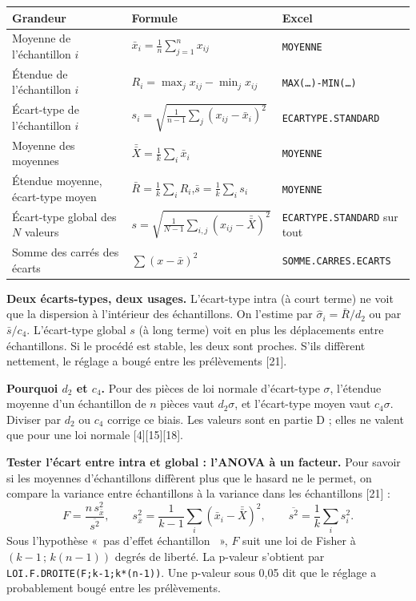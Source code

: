 \documentclass[11pt,a4paper]{article}
\providecommand{\og}{«~}\providecommand{\fg}{~»}
\newcommand{\xbb}{\bar{\bar{X}}}
\newcommand{\Rb}{\bar{R}}
\newcommand{\xl}[1]{\texttt{\small #1}}
\begin{document}
\begin{center}\small
\renewcommand{\arraystretch}{1.5}
\begin{tabularx}{\textwidth}{@{}Xll@{}}\toprule
\textbf{Grandeur} & \textbf{Formule} & \textbf{Excel}\\\midrule
Moyenne de l'échantillon $i$ & $\bar x_i=\frac1n\sum_{j=1}^n x_{ij}$ & \xl{MOYENNE}\\
Étendue de l'échantillon $i$ & $R_i=\max_j x_{ij}-\min_j x_{ij}$ & \xl{MAX(\dots)-MIN(\dots)}\\
Écart-type de l'échantillon $i$ & $s_i=\sqrt{\frac1{n-1}\sum_{j}(x_{ij}-\bar x_i)^2}$ & \xl{ECARTYPE.STANDARD}\\
Moyenne des moyennes & $\xbb=\frac1k\sum_i\bar x_i$ & \xl{MOYENNE}\\
Étendue moyenne, écart-type moyen & $\Rb=\frac1k\sum_iR_i$,\quad $\bar s=\frac1k\sum_is_i$ & \xl{MOYENNE}\\
Écart-type global des $N$ valeurs & $s=\sqrt{\frac1{N-1}\sum_{i,j}(x_{ij}-\xbb)^2}$ & \xl{ECARTYPE.STANDARD} sur tout\\
Somme des carrés des écarts & $\sum (x-\bar x)^2$ & \xl{SOMME.CARRES.ECARTS}\\\bottomrule
\end{tabularx}
\end{center}

\textbf{Deux écarts-types, deux usages.} L'écart-type intra (à court terme) ne voit que la dispersion à l'intérieur des échantillons. On l'estime par $\hat\sigma_i=\Rb/d_2$ ou par $\bar s/c_4$. L'écart-type global $s$ (à long terme) voit en plus les déplacements entre échantillons. Si le procédé est stable, les deux sont proches. S'ils diffèrent nettement, le réglage a bougé entre les prélèvements [21].

\textbf{Pourquoi $d_2$ et $c_4$.} Pour des pièces de loi normale d'écart-type $\sigma$, l'étendue moyenne d'un échantillon de $n$ pièces vaut $d_2\sigma$, et l'écart-type moyen vaut $c_4\sigma$. Diviser par $d_2$ ou $c_4$ corrige ce biais. Les valeurs sont en partie D ; elles ne valent que pour une loi normale [4][15][18].

\textbf{Tester l'écart entre intra et global : l'ANOVA à un facteur.} Pour savoir si les moyennes d'échantillons diffèrent plus que le hasard ne le permet, on compare la variance entre échantillons à la variance dans les échantillons [21] :
\[
F=\frac{n\,s_{\bar x}^2}{\overline{s^2}},\qquad s_{\bar x}^2=\frac1{k-1}\sum_i(\bar x_i-\xbb)^2,\qquad \overline{s^2}=\frac1k\sum_i s_i^2 .
\]
Sous l'hypothèse \og pas d'effet échantillon \fg, $F$ suit une loi de Fisher à $(k-1\,;\,k(n-1))$ degrés de liberté. La p-valeur s'obtient par \xl{LOI.F.DROITE(F;k-1;k*(n-1))}. Une p-valeur sous 0,05 dit que le réglage a probablement bougé entre les prélèvements.
\end{document}
